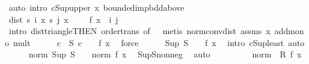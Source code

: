 \begin{isabellebody}
\ {\isacharparenleft}{\kern0pt}auto\ intro{\isacharbang}{\kern0pt}{\isacharcolon}{\kern0pt}\ cSup{\isacharunderscore}{\kern0pt}upper{}\ x\ bounded{\isacharunderscore}{\kern0pt}imp{\isacharunderscore}{\kern0pt}bdd{\isacharunderscore}{\kern0pt}above{\isacharparenright}{\kern0pt}\isanewline
\isanewline
\ \ \ \ \isamarkupfalse%
\ {\isachardoublequoteopen}dist\ {\isacharparenleft}{\kern0pt}s\ i\ x{\isacharparenright}{\kern0pt}\ {\isacharparenleft}{\kern0pt}s\ j\ x{\isacharparenright}{\kern0pt}\ {\isasymle}\ \ {}\ {\isacharasterisk}{\kern0pt}\ f\ x{\isachardoublequoteclose}\ \ i\ j\ \isamarkupfalse%
\ {\isacharparenleft}{\kern0pt}intro\ dist{\isacharunderscore}{\kern0pt}triangle{}{\isacharbrackleft}{\kern0pt}THEN\ order{\isacharunderscore}{\kern0pt}trans{\isacharcomma}{\kern0pt}\ of\ {\isacharunderscore}{\kern0pt}\ {}{\isacharbrackright}{\kern0pt}{\isacharparenright}{\kern0pt}\ {\isacharparenleft}{\kern0pt}metis\ norm{\isacharunderscore}{\kern0pt}conv{\isacharunderscore}{\kern0pt}dist\ assms{\isacharparenleft}{\kern0pt}{}{\isacharparenright}{\kern0pt}\ x\ add{\isacharunderscore}{\kern0pt}mono\ mult{\isacharunderscore}{\kern0pt}{}{\isacharparenright}{\kern0pt}\isanewline
\ \ \ \ \isamarkupfalse%
\ {\isachardoublequoteopen}{\isasymforall}c\ {\isasymin}\ {\isacharquery}{\kern0pt}S{\isachardot}{\kern0pt}\ c\ {\isasymle}\ {}\ {\isacharasterisk}{\kern0pt}\ f\ x{\isachardoublequoteclose}\ \isamarkupfalse%
\ force\isanewline
\ \ \ \ \isamarkupfalse%
\ {\isachardoublequoteopen}Sup\ {\isacharquery}{\kern0pt}S\ {\isasymle}\ {}\ {\isacharasterisk}{\kern0pt}\ f\ x{\isachardoublequoteclose}\ \isamarkupfalse%
\ {\isacharparenleft}{\kern0pt}intro\ cSup{\isacharunderscore}{\kern0pt}least{\isacharcomma}{\kern0pt}\ auto{\isacharparenright}{\kern0pt}\isanewline
\ \ \ \ \isamarkupfalse%
\ {\isachardoublequoteopen}norm\ {\isacharparenleft}{\kern0pt}Sup\ {\isacharquery}{\kern0pt}S{\isacharparenright}{\kern0pt}\ {\isasymle}\ {}\ {\isacharasterisk}{\kern0pt}\ norm\ {\isacharparenleft}{\kern0pt}f\ x{\isacharparenright}{\kern0pt}{\isachardoublequoteclose}\ \isamarkupfalse%
\ Sup{\isacharunderscore}{\kern0pt}S{\isacharunderscore}{\kern0pt}nonneg\ \isamarkupfalse%
\ auto\isanewline
\ \ \ \ \isamarkupfalse%
\ \isamarkupfalse%
\ {\isachardoublequoteopen}{\isachardot}{\kern0pt}{\isachardot}{\kern0pt}{\isachardot}{\kern0pt}\ {\isacharequal}{\kern0pt}\ norm\ {\isacharparenleft}{\kern0pt}{}\ {\isacharasterisk}{\kern0pt}\isactrlsub R\ f\ x{\isacharparenright}{\kern0pt}{\isachardoublequoteclose}\ \isamarkupfalse%

\end{isabellebody}
